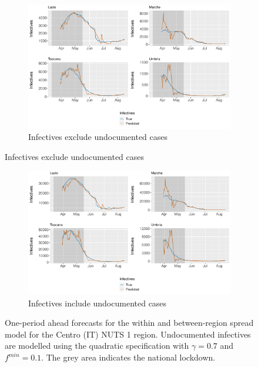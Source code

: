 \documentclass[12pt]{article}
\begin{document}
\begin{appendices}
        \begin{figure}[H]
    	    \centering
    	    \begin{subfigure}{\textwidth}
    	      \centering
    	      \includegraphics[width=0.91\linewidth]{output/model_between_lag14_forecast_start20_Centro (IT)_rolling.pdf}
    	      \caption{Infectives exclude undocumented cases}
    	      \label{fig:forecast_between_centro_regular}
    	    \end{subfigure}
        \end{figure}
        \begin{figure}[H]\ContinuedFloat
    	    \begin{subfigure}{\textwidth}
    	      \centering
    	      \includegraphics[width=0.91\linewidth]{output/model_between_lag14_forecast_start20_Centro (IT)_UndocQuadratic_rolling.pdf}
    	      \caption{Infectives include undocumented cases}
    	      \label{fig:forecast_between_centro_undoc}
    	    \end{subfigure}
    	    \caption{One-period ahead forecasts for the within and between-region spread model for the Centro (IT) NUTS 1 region. Undocumented infectives are modelled using the quadratic specification with $\gamma = 0.7$ and $f^{min}=0.1$. The grey area indicates the national lockdown.}
    	    \label{fig:forecast_between_centro}
        \end{figure}
        

\end{appendices}
\end{document}
